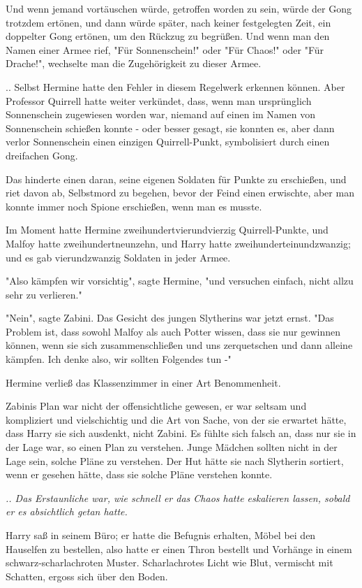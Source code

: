 {Und wenn jemand vortäuschen würde, getroffen worden zu sein, würde der Gong trotzdem ertönen, und dann würde später, nach keiner festgelegten Zeit, ein doppelter Gong ertönen, um den Rückzug zu begrüßen. Und wenn man den Namen einer Armee rief, "Für Sonnenschein!" oder "Für Chaos!" oder "Für Drache!", wechselte man die Zugehörigkeit zu dieser Armee.

.. Selbst Hermine hatte den Fehler in diesem Regelwerk erkennen können. Aber Professor Quirrell hatte weiter verkündet, dass, wenn man ursprünglich Sonnenschein zugewiesen worden war, niemand auf einen im Namen von Sonnenschein schießen konnte - oder besser gesagt, sie konnten es, aber dann verlor Sonnenschein einen einzigen Quirrell-Punkt, symbolisiert durch einen dreifachen Gong.

Das hinderte einen daran, seine eigenen Soldaten für Punkte zu erschießen, und riet davon ab, Selbstmord zu begehen, bevor der Feind einen erwischte, aber man konnte immer noch Spione erschießen, wenn man es musste.

Im Moment hatte Hermine zweihundertvierundvierzig Quirrell-Punkte, und Malfoy hatte zweihundertneunzehn, und Harry hatte zweihunderteinundzwanzig; und es gab vierundzwanzig Soldaten in jeder Armee.

"Also kämpfen wir vorsichtig", sagte Hermine, "und versuchen einfach, nicht allzu sehr zu verlieren."

"Nein", sagte Zabini. Das Gesicht des jungen Slytherins war jetzt ernst. "Das Problem ist, dass sowohl Malfoy als auch Potter wissen, dass sie nur gewinnen können, wenn sie sich zusammenschließen und uns zerquetschen und dann alleine kämpfen. Ich denke also, wir sollten Folgendes tun -"

Hermine verließ das Klassenzimmer in einer Art Benommenheit.

Zabinis Plan war nicht der offensichtliche gewesen, er war seltsam und kompliziert und vielschichtig und die Art von Sache, von der sie erwartet hätte, dass Harry sie sich ausdenkt, nicht Zabini. Es fühlte sich falsch an, dass nur sie in der Lage war, so einen Plan zu verstehen. Junge Mädchen sollten nicht in der Lage sein, solche Pläne zu verstehen. Der Hut hätte sie nach Slytherin sortiert, wenn er gesehen hätte, dass sie solche Pläne verstehen konnte.

\emph{.. Das Erstaunliche war, wie schnell er das Chaos hatte eskalieren lassen, sobald er es absichtlich getan hatte.}

Harry saß in seinem Büro; er hatte die Befugnis erhalten, Möbel bei den Hauselfen zu bestellen, also hatte er einen Thron bestellt und Vorhänge in einem schwarz-scharlachroten Muster. Scharlachrotes Licht wie Blut, vermischt mit Schatten, ergoss sich über den Boden.

}
